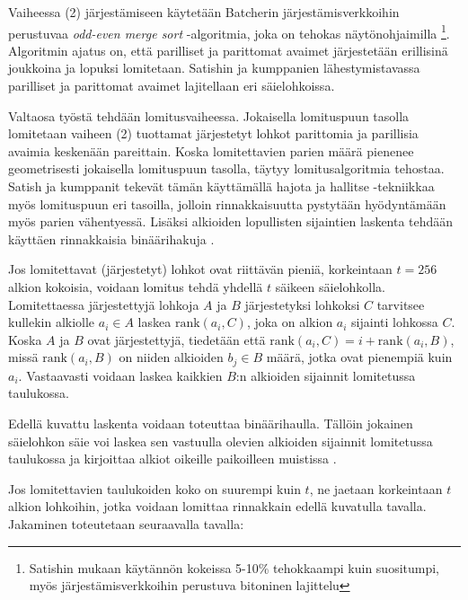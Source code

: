 \documentclass[a4paper,11pt]{article}
\newcommand{\engl}[1]{\foreignlanguage{english}{\em #1}}
\begin{document}
Vaiheessa (2) järjestämiseen käytetään Batcherin järjestämisverkkoihin perustuvaa \engl{odd-even merge sort} -algoritmia, joka on tehokas näytönohjaimilla \cite{kipfer2005gpugems}\footnote{Satishin \cite{satish2009} mukaan käytännön kokeissa 5-10\% tehokkaampi kuin suositumpi, myös järjestämisverkkoihin perustuva bitoninen lajittelu}. Algoritmin ajatus on, että parilliset ja parittomat avaimet järjestetään erillisinä joukkoina ja lopuksi lomitetaan. Satishin ja kumppanien lähestymistavassa parilliset ja parittomat avaimet lajitellaan eri säielohkoissa.

Valtaosa työstä tehdään lomitusvaiheessa. Jokaisella lomituspuun tasolla lomitetaan vaiheen (2) tuottamat järjestetyt lohkot parittomia ja parillisia avaimia keskenään pareittain. Koska lomitettavien parien määrä pienenee geometrisesti jokaisella lomituspuun tasolla, täytyy lomitusalgoritmia tehostaa. Satish ja kumppanit tekevät tämän käyttämällä hajota ja hallitse -tekniikkaa myös lomituspuun eri tasoilla, jolloin rinnakkaisuutta pystytään hyödyntämään myös parien vähentyessä. Lisäksi alkioiden lopullisten sijaintien laskenta tehdään käyttäen rinnakkaisia binäärihakuja \cite{satish2009}.

Jos lomitettavat (järjestetyt) lohkot ovat riittävän pieniä, korkeintaan $t = 256$ alkion kokoisia, voidaan lomitus tehdä yhdellä $t$ säikeen säielohkolla. Lomitettaessa järjestettyjä lohkoja $A$ ja $B$ järjestetyksi lohkoksi $C$ tarvitsee kullekin alkiolle $a_i \in A$ laskea $\mathrm{rank}(a_i, C)$, joka on alkion $a_i$ sijainti lohkossa $C$. Koska $A$ ja $B$ ovat järjestettyjä, tiedetään että $\mathrm{rank}(a_i, C) = i + \mathrm{rank}(a_i, B)$, missä $\mathrm{rank}(a_i, B)$ on niiden alkioiden $b_j \in B$ määrä, jotka ovat pienempiä kuin $a_i$. Vastaavasti voidaan laskea kaikkien $B$:n alkioiden sijainnit lomitetussa taulukossa.

Edellä kuvattu laskenta voidaan toteuttaa binäärihaulla. Tällöin jokainen säielohkon säie voi laskea sen vastuulla olevien alkioiden sijainnit lomitetussa taulukossa ja kirjoittaa alkiot oikeille paikoilleen muistissa \cite{satish2009}.

Jos lomitettavien taulukoiden koko on suurempi kuin $t$, ne jaetaan korkeintaan $t$ alkion lohkoihin, jotka voidaan lomittaa rinnakkain edellä kuvatulla tavalla. Jakaminen toteutetaan seuraavalla tavalla:
\end{document}
